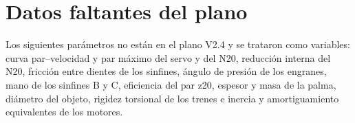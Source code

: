 \documentclass[11pt,letterpaper]{article}
\begin{document}


\appendix
\section{Datos faltantes del plano}
Los siguientes parámetros no están en el plano V2.4 y se trataron como variables: curva par--velocidad y par máximo del servo y del N20, reducción interna del N20, fricción entre dientes de los sinfines, ángulo de presión de los engranes, mano de los sinfines B y C, eficiencia del par z20, espesor y masa de la palma, diámetro del objeto, rigidez torsional de los trenes e inercia y amortiguamiento equivalentes de los motores.
\end{document}
